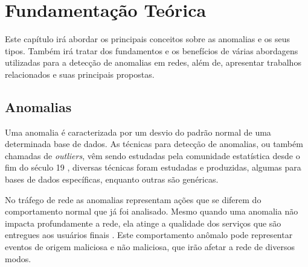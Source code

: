 \chapter{Fundamentação Teórica}
\indent Este capítulo irá abordar os principais conceitos sobre as anomalias e os seus tipos. Também irá tratar dos fundamentos e os benefícios de várias abordagens utilizadas para a detecção de anomalias em redes, além de, apresentar trabalhos relacionados e suas principais propostas.

  \section{Anomalias}

\indent Uma anomalia é caracterizada por um desvio do padrão normal de uma determinada base de dados. As técnicas para detecção de anomalias, ou também chamadas de \textit{outliers}, vêm sendo estudadas pela comunidade estatística desde o fim do século 19 \cite{edgeworth1887}, diversas técnicas foram estudadas e produzidas, algumas para bases de dados específicas, enquanto outras são genéricas.

\indent No tráfego de rede as anomalias representam ações que se diferem do comportamento normal que já foi analisado. Mesmo quando uma anomalia não impacta profundamente a rede, ela atinge a qualidade dos serviços que são entregues aos usuários finais \cite{Lakhina:2004}. Este comportamento anômalo pode representar eventos de origem maliciosa e não maliciosa, que irão afetar a rede de diversos modos.

